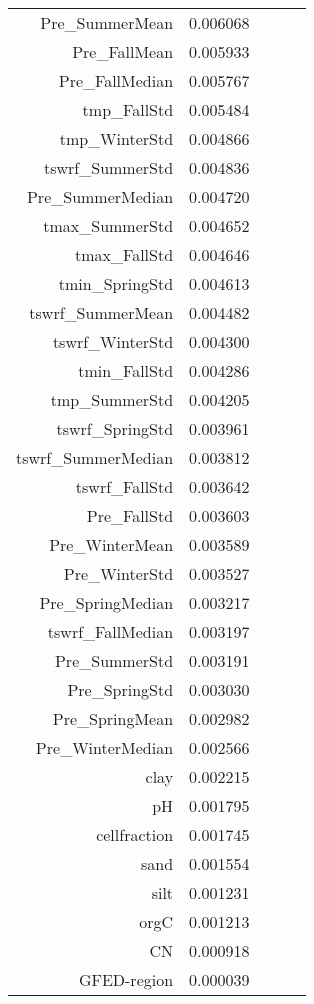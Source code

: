 \begin{tabular}{rrrrr}
Pre_SummerMean & 0.006068 \\
Pre_FallMean & 0.005933 \\
Pre_FallMedian & 0.005767 \\
tmp_FallStd & 0.005484 \\
tmp_WinterStd & 0.004866 \\
tswrf_SummerStd & 0.004836 \\
Pre_SummerMedian & 0.004720 \\
tmax_SummerStd & 0.004652 \\
tmax_FallStd & 0.004646 \\
tmin_SpringStd & 0.004613 \\
tswrf_SummerMean & 0.004482 \\
tswrf_WinterStd & 0.004300 \\
tmin_FallStd & 0.004286 \\
tmp_SummerStd & 0.004205 \\
tswrf_SpringStd & 0.003961 \\
tswrf_SummerMedian & 0.003812 \\
tswrf_FallStd & 0.003642 \\
Pre_FallStd & 0.003603 \\
Pre_WinterMean & 0.003589 \\
Pre_WinterStd & 0.003527 \\
Pre_SpringMedian & 0.003217 \\
tswrf_FallMedian & 0.003197 \\
Pre_SummerStd & 0.003191 \\
Pre_SpringStd & 0.003030 \\
Pre_SpringMean & 0.002982 \\
Pre_WinterMedian & 0.002566 \\
clay & 0.002215 \\
pH & 0.001795 \\
cellfraction & 0.001745 \\
sand & 0.001554 \\
silt & 0.001231 \\
orgC & 0.001213 \\
CN & 0.000918 \\
GFED-region & 0.000039 \\
\bottomrule
\end{tabular}

